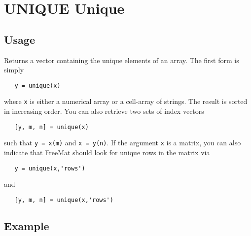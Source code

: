 \section{UNIQUE Unique}

\subsection{Usage}

Returns a vector containing the unique elements of an array.  The first
form is simply
\begin{verbatim}
   y = unique(x)
\end{verbatim}
where \verb|x| is either a numerical array or a cell-array of strings.  The 
result is sorted in increasing order.  You can also retrieve two sets
of index vectors
\begin{verbatim}
   [y, m, n] = unique(x)
\end{verbatim}
such that \verb|y = x(m)| and \verb|x = y(n)|.  If the argument \verb|x| is a matrix,
you can also indicate that FreeMat should look for unique rows in the
matrix via
\begin{verbatim}
   y = unique(x,'rows')
\end{verbatim}
and
\begin{verbatim}
   [y, m, n] = unique(x,'rows')
\end{verbatim}
\subsection{Example}

